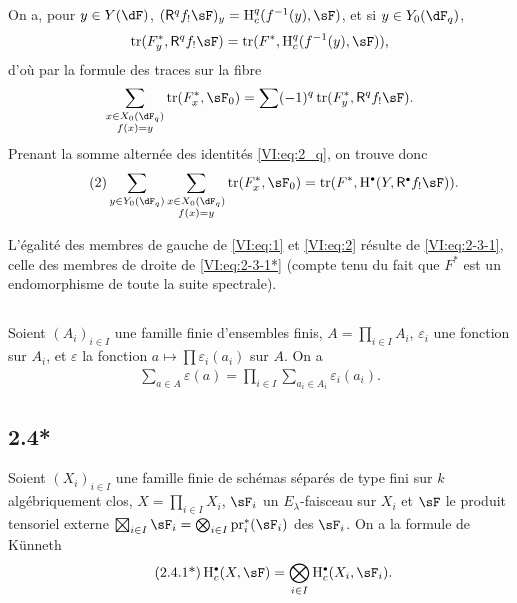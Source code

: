 On a, pour $y\in Y(\dF)$, $(\R^q f_! \sF)_y = \h_c^q(f^{-1}(y),\sF)$, et si 
$y\in Y_0(\dF_q)$, 
\[
  \tr(F_y^\ast,\R^q f_! \sF) = \tr(F^\ast,\h_c^q(f^{-1}(y),\sF)) \text{,}
\]
d'o\`u par la formule des traces sur la fibre 
\[
  \sum_{\substack{x\in X_0(\dF_q) \\ f(x) = y}} \tr(F_x^\ast,\sF_0) = \sum (-1)^q \tr(F_y^\ast,\R^q f_! \sF) \text{.}
\]
Prenant la somme altern\'ee des identit\'es \eqref{VI:eq:2_q}, on trouve donc 
\begin{align*}\tag{2}\label{VI:eq:2}
  \sum_{y\in Y_0(\dF_q)} \sum_{\substack{x \in X_0(\dF_q) \\ f(x) = y}} \tr(F_x^\ast,\sF_0) = \tr(F^\ast,\h^\bullet(Y,\R^\bullet f_! \sF)) \text{.}
\end{align*}

L'\'egalit\'e des membres de gauche de \eqref{VI:eq:1} et \eqref{VI:eq:2} 
r\'esulte de \eqref{VI:eq:2-3-1}, celle des membres de droite de 
\eqref{VI:eq:2-3-1*} (compte tenu du fait que $F^\ast$ est un endomorphisme de 
toute la suite spectrale). 





\subsection{}\label{VI:2-4}

Soient $(A_i)_{i\in I}$ une famille finie d'ensembles finis, 
$A=\prod_{i\in I} A_i$, $\varepsilon_i$ une fonction sur $A_i$, et 
$\varepsilon$ la fonction $a\mapsto \prod \varepsilon_i(a_i)$ sur $A$. On a 
\begin{align*}\tag{2.4.1}\label{VI:eq:2-4-1}
  \sum_{a\in A} \varepsilon(a) = \prod_{i\in I} \sum_{a_i\in A_i} \varepsilon_i(a_i) \text{.}
\end{align*}





\subsection*{2.4*}\label{VI:2-4*}

Soient $(X_i)_{i\in I}$ une famille finie de sch\'emas s\'epar\'es de type fini 
sur $k$ alg\'ebriquement clos, $X=\prod_{i\in I} X_i$, $\sF_i$ un 
$E_\lambda$-faisceau sur $X_i$ et $\sF$ le produit tensoriel externe 
$\bigboxtimes_{i\in I}\sF_i = \bigotimes_{i\in I} \operatorname{pr}_i^\ast(\sF_i)$ 
des $\sF_i$. On a la formule de K\"unneth 
\begin{align*}\tag{2.4.1*}\label{VI:eq:2-4-1*}
  \h_c^\bullet(X,\sF) = \bigotimes_{i\in I} \h_c^\bullet(X_i,\sF_i) \text{.}
\end{align*}

